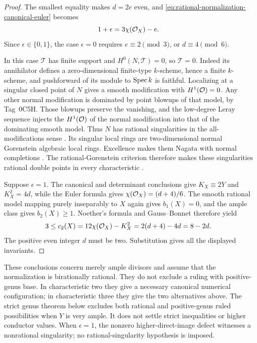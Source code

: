 \begin{proof}
The smallest equality makes $d=2e$ even, and
\eqref{eq:rational-normalization-canonical-euler} becomes
\[
 1+\epsilon=3\chi(\mathcal O_X)-e.
\]
Since $\epsilon\in\{0,1\}$, the case $\epsilon=0$ requires
$e\equiv2\pmod3$, or $d\equiv4\pmod6$.

In this case $\mathcal T$ has finite support and
$H^0(N,\mathcal T)=0$, so $\mathcal T=0$.
Indeed its annihilator defines a zero-dimensional finite-type
$k$-scheme, hence a finite $k$-scheme, and pushforward of its
module to $\operatorname{Spec} k$ is faithful.
Localizing at a singular closed point of $N$ gives a smooth
modification with $H^1(\mathcal O)=0$.
Any other normal modification is dominated by point blowups of
that model, by Tag~0C5H. Those blowups preserve the vanishing,
and the low-degree Leray sequence injects the $H^1(\mathcal O)$ of
the normal modification into that of the dominating smooth model.
Thus $N$ has rational singularities in the all-modifications
sense \cite[Tag~0B4N]{Stacks}.
Its singular local rings are two-dimensional normal Gorenstein
algebraic local rings. Excellence makes them Nagata with normal
completions \cite[IV, 7.8.3(ii), (iii), (v), (vi)]{EGA}.
The rational-Gorenstein criterion therefore makes these
singularities rational double points in every characteristic
\cite[Sections~54.9 and~54.12, Tags~0B4V and~0BGB]{Stacks}.

Suppose $\epsilon=1$.
The canonical and determinant conclusions give
$K_X\equiv2Y$ and $K_X^2=4d$, while the Euler formula gives
$\chi(\mathcal O_X)=(d+4)/6$.
The smooth rational model mapping purely inseparably to $X$
again gives $b_1(X)=0$, and the ample class gives $b_2(X)\geq1$.
Noether's formula and Gauss--Bonnet therefore yield
\[
 3\leq c_2(X)
 =12\chi(\mathcal O_X)-K_X^2
 =2(d+4)-4d
 =8-2d.
\]
The positive even integer $d$ must be two.
Substitution gives all the displayed invariants.

\end{proof}

\begin{remark}\label{rem:rational-canonical-scope}
These conclusions concern merely ample divisors and assume that the
normalization is birationally rational. They do not exclude a ruling
with positive-genus base. In characteristic two they give a necessary
canonical numerical configuration; in characteristic three they give
the two alternatives above. The strict genus theorem below excludes
both rational and positive-genus ruled possibilities when $Y$ is very
ample. It does not settle strict inequalities or higher conductor values.
When $\epsilon=1$, the nonzero higher-direct-image defect witnesses a
nonrational singularity; no rational-singularity hypothesis is imposed.
\end{remark}
